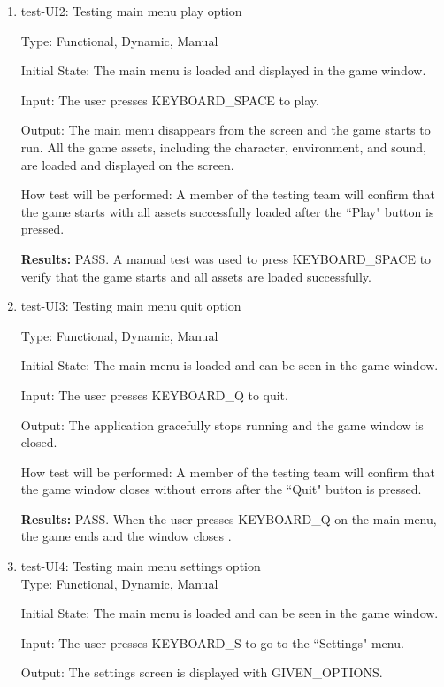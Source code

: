 \documentclass[12pt, titlepage]{article}
\begin{document}
\begin{enumerate}

\item{test-UI2: Testing main menu play option\\}

Type: Functional, Dynamic, Manual
					
Initial State: The main menu is loaded and displayed in the game window.
					
Input: The user presses KEYBOARD\_SPACE to play.
					
Output: The main menu disappears from the screen and the game starts to run. All the game assets, including the character, environment, and sound, are loaded and displayed on the screen.
					
How test will be performed: A member of the testing team will confirm that the game starts with all assets successfully loaded after the ``Play" button is pressed.

\textbf{Results:} PASS. A manual test was used to press KEYBOARD\_SPACE to verify that the game starts and all assets are loaded successfully.

\item{test-UI3: Testing main menu quit option\\}

Type: Functional, Dynamic, Manual
					
Initial State: The main menu is loaded and can be seen in the game window.
					
Input: The user presses KEYBOARD\_Q to quit.
					
Output: The application gracefully stops running and the game window is closed.
					
How test will be performed: A member of the testing team will confirm that the game window closes without errors after the ``Quit" button is pressed.

\textbf{Results:} PASS. When the user presses KEYBOARD\_Q on the main menu, the game ends and the window closes .

\item{test-UI4: Testing main menu settings option}\\
Type: Functional, Dynamic, Manual
					
Initial State: The main menu is loaded and can be seen in the game window.
					
Input: The user presses KEYBOARD\_S to go to the ``Settings" menu.

Output: The settings screen is displayed with GIVEN\_OPTIONS.
					

\end{enumerate}
\end{document}

